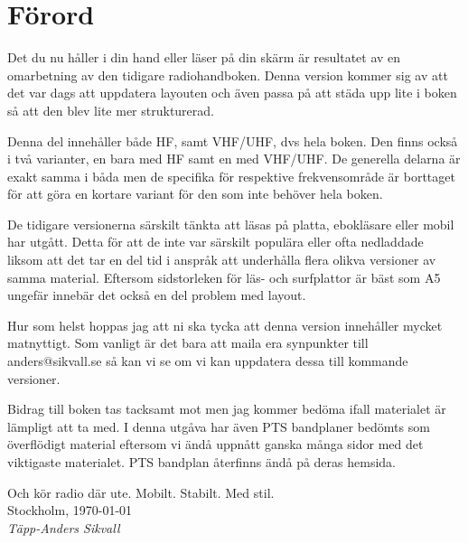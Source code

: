 





\setlength{\parskip}{0.5em}
\setlength{\parindent}{0pt}



\section*{Förord}

Det du nu håller i din hand eller läser på din skärm är resultatet av en omarbetning av den tidigare radiohandboken. Denna version kommer sig av att det var dags att uppdatera layouten och även passa på att städa upp lite i boken så att den blev lite mer strukturerad.

Denna del innehåller både HF, samt VHF/UHF, dvs hela boken. Den finns också i två varianter, en bara med HF samt en med VHF/UHF. De generella delarna är exakt samma i båda men de specifika för respektive frekvensområde är borttaget för att göra en kortare variant för den som inte behöver hela boken.

De tidigare versionerna särskilt tänkta att läsas på platta, ebokläsare eller mobil har utgått. Detta för att de inte var särskilt populära eller ofta nedladdade liksom att det tar en del tid i anspråk att underhålla flera olikva versioner av samma material. Eftersom sidstorleken för läs- och surfplattor är bäst som A5 ungefär innebär det också en del problem med layout.

Hur som helst hoppas jag att ni ska tycka att denna version innehåller mycket matnyttigt. Som vanligt är det bara att maila era synpunkter till anders@sikvall.se så kan vi se om vi kan uppdatera dessa till kommande versioner.

Bidrag till boken tas tacksamt mot men jag kommer bedöma ifall materialet är lämpligt att ta med. I denna utgåva har även PTS bandplaner bedömts som överflödigt material eftersom vi ändå uppnått ganska många sidor med det viktigaste materialet. PTS bandplan återfinns ändå på deras hemsida.

Och kör radio där ute. Mobilt. Stabilt. Med stil.\\[4em]

Stockholm, \today\\
\textit{Täpp-Anders Sikvall}

\clearpage